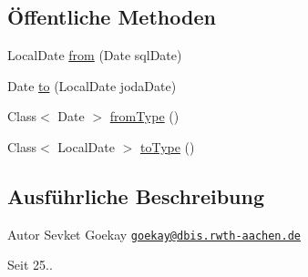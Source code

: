 \subsection*{Öffentliche Methoden}
\begin{DoxyCompactItemize}
\item 
Local\+Date \hyperlink{classde_1_1rwth_1_1idsg_1_1steve_1_1utils_1_1_date_converter_aaa5fde5d6587bc577e4dc66adb593d85}{from} (Date sql\+Date)
\item 
Date \hyperlink{classde_1_1rwth_1_1idsg_1_1steve_1_1utils_1_1_date_converter_abc397ad1d1a5de126d282c2fd716a090}{to} (Local\+Date joda\+Date)
\item 
Class$<$ Date $>$ \hyperlink{classde_1_1rwth_1_1idsg_1_1steve_1_1utils_1_1_date_converter_ab0f8d5d4d13d57ab986c4432d4a9e4e3}{from\+Type} ()
\item 
Class$<$ Local\+Date $>$ \hyperlink{classde_1_1rwth_1_1idsg_1_1steve_1_1utils_1_1_date_converter_a59d67af6551b4f352f9f4b4e30bc1527}{to\+Type} ()
\end{DoxyCompactItemize}


\subsection{Ausführliche Beschreibung}
\begin{DoxyAuthor}{Autor}
Sevket Goekay \href{mailto:goekay@dbis.rwth-aachen.de}{\tt goekay@dbis.\+rwth-\/aachen.\+de} 
\end{DoxyAuthor}
\begin{DoxySince}{Seit}
25.. 
\end{DoxySince}


